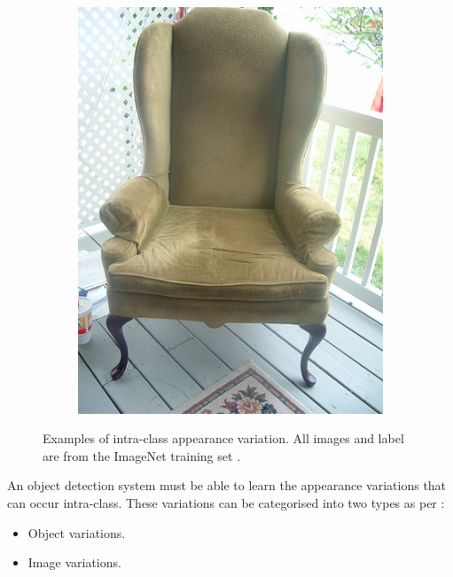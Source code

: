 \begin{figure}[H]
\begin{subfigure}[b]{0.2\textwidth}
        \includegraphics[width=\textwidth]{Figs/Problem/chair4.jpeg}
        \caption{}
    \end{subfigure}
    \caption{Examples of intra-class appearance variation. All images and label are from the ImageNet training set \cite{imagenet}.}
    \label{fig:intra_ex}
\end{figure} 

An object detection system must be able to learn the appearance variations that can occur intra-class. These variations can be categorised into two types as per \cite{schroff}:

\begin{itemize}
	\item Object variations.
	\item Image variations.
\end{itemize}

